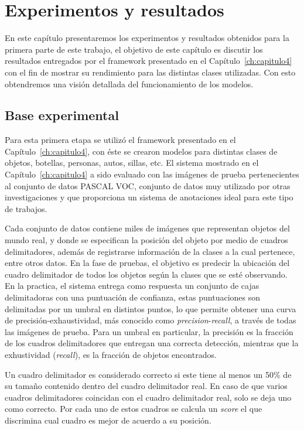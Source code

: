 \chapter[Experimentos y resultados]{Experimentos y resultados}\label{ch:capitulo5}
En este capítulo presentaremos los experimentos y resultados obtenidos para la primera parte de este trabajo, el objetivo de este capítulo es discutir los resultados entregados por el framework presentado en el Capítulo~\ref{ch:capitulo4} con el fin de mostrar su rendimiento para las distintas clases utilizadas. Con esto obtendremos una visión detallada del funcionamiento de los modelos.

\section{Base experimental}
Para esta primera etapa se utilizó el framework presentado en el Capítulo~\ref{ch:capitulo4}, con éste se crearon modelos para distintas clases de objetos, botellas, personas, autos, sillas, etc. El sistema mostrado en el Capítulo~\ref{ch:capitulo4} a sido evaluado con las imágenes de prueba pertenecientes al conjunto de datos PASCAL VOC, conjunto de datos muy utilizado por otras investigaciones y que proporciona un sistema de anotaciones ideal para este tipo de trabajos. 

Cada conjunto de datos contiene miles de imágenes que representan objetos del mundo real, y  donde se especifican la posición del objeto por medio de cuadros delimitadores, además de registrarse información de la clases a la cual pertenece, entre otros datos. En la fase de pruebas, el objetivo es predecir la ubicación del cuadro delimitador de todos los objetos según la clases que se esté observando. En la practica, el sistema entrega como respuesta un conjunto de cajas delimitadoras con una puntuación de confianza, estas puntuaciones son delimitadas por un umbral en distintos puntos, lo que permite obtener una curva de precisión-exhaustividad, más conocido como \textit{precision}-\textit{recall}, a través de todas las imágenes de prueba. Para un umbral en particular, la precisión es la fracción de los cuadros delimitadores que entregan una correcta detección, mientras que la exhustividad (\textit{recall}), es la fracción de objetos encontrados.

Un cuadro delimitador es considerado correcto si este tiene al menos un 50\% de su tamaño contenido dentro del cuadro delimitador real. En caso de que varios cuadros delimitadores coincidan con el cuadro delimitador real, solo se deja uno como correcto. Por cada uno de estos cuadros se calcula un \textit{score} el que discrimina cual cuadro es mejor de acuerdo a su posición.

